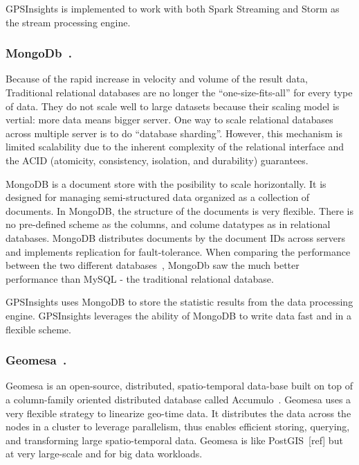 \documentclass{acm_proc_article-sp}
\begin{document}
GPSInsights is implemented to work with both Spark Streaming and Storm as the stream processing engine.

\subsubsection{MongoDb~\cite{mongodbweb}.}


Because of the rapid increase in velocity and volume of the result data, Traditional relational databases are no longer the ``one-size-fits-all'' for every type of data. They do not scale well to large datasets because their scaling model is vertial: more data means bigger server. One way to scale relational databases across multiple server is to do ``database sharding''. However, this mechanism is limited scalability due to the inherent complexity of the relational interface and the ACID (atomicity, consistency, isolation, and durability) guarantees. 

MongoDB is a document store with the posibility to scale horizontally. It is designed for managing semi-structured data organized as a collection of documents. In MongoDB, the structure of the documents is very flexible. There is no pre-defined scheme as the columns, and colume datatypes as in relational databases. MongoDB distributes documents by the document IDs across servers and implements replication for fault-tolerance. When comparing the performance between the two different databases~\cite{10.11648/j.ajsea.20150402.12}, MongoDb saw the much better performance than MySQL - the traditional relational database.

GPSInsights uses MongoDB to store the statistic results from the data processing engine. GPSInsights leverages the ability of MongoDB to write data fast and in a flexible scheme. 

\subsubsection{Geomesa~\cite{fox2013spatio}.}
 
Geomesa is an open-source, distributed, spatio-temporal data-base built on top of a column-family oriented distributed database called Accumulo~\cite{accumuloonline}. Geomesa uses a very flexible strategy to linearize geo-time data. It distributes the data across the nodes in a cluster to leverage parallelism, thus enables efficient storing, querying, and transforming large spatio-temporal data. Geomesa is like PostGIS~[ref] but at very large-scale and for big data workloads. 
\end{document}
